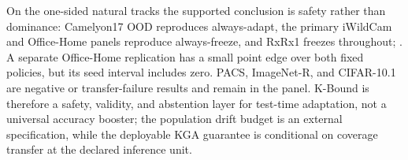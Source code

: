 %

On the one-sided natural tracks the supported conclusion is safety rather than dominance:
Camelyon17 OOD reproduces always-adapt, the primary iWildCam and Office-Home panels reproduce
always-freeze, and RxRx1 freezes throughout; . A separate
Office-Home replication has a small point edge over both fixed policies, but its seed interval
includes zero. PACS, ImageNet-R, and CIFAR-10.1 are negative or transfer-failure results and remain in
the panel. K-Bound is therefore a safety, validity, and abstention layer for test-time adaptation,
not a universal accuracy booster; the population drift budget is an external specification, while
the deployable KGA guarantee is conditional on coverage transfer at the declared inference unit.
